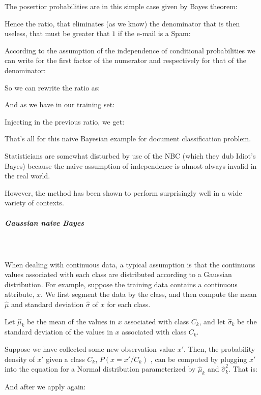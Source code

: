 \begin{tcolorbox}[colframe=black,colback=white,sharp corners]
	The posertior probabilities are in this simple case given by Bayes theorem:
	
	Hence the ratio, that eliminates (as we know) the denominator that is then useless, that must be greater that $1$ if the e-mail is a Spam:
	
	According to the assumption of the independence of conditional probabilities we can write for the first factor of the numerator and respectively for that of the denominator:
	
	So we can rewrite the ratio as:
	
	And as we have in our training set:
	\end{tcolorbox}
	\begin{tcolorbox}[colframe=black,colback=white,sharp corners]
	
	Injecting in the previous ratio, we get:
	
	That's all for this naive Bayesian example for document classification problem.
	\end{tcolorbox}
	Statisticians are somewhat disturbed by use of the NBC (which they dub Idiot's Bayes) because the naive assumption of independence is almost always invalid in the real world.
	
	However, the method has been shown to perform surprisingly well in a wide variety of contexts.
	
	\subparagraph{Gaussian naive Bayes}\mbox{}\\\\
	When dealing with continuous data, a typical assumption is that the continuous values associated with each class are distributed according to a Gaussian distribution. For example, suppose the training data contains a continuous attribute, $x$. We first segment the data by the class, and then compute the mean $\hat{\mu}$ and standard deviation $\hat{\sigma}$ of $x$ for each class.
	
	 Let $\hat{\mu} _{k}$ be the mean of the values in $x$ associated with class $C_k$, and let $\hat{\sigma}_{k}$ be the standard deviation of the values in $x$ associated with class $C_k$.
	 
	 Suppose we have collected some new observation value $x'$. Then, the probability density of $x'$ given a class $C_{k}$, $P(x=x'/C_{k})$ , can be computed by plugging $x'$ into the equation for a Normal distribution parameterized by $\hat{\mu}_{k}$ and $\hat{\sigma}_{k}^{2}$. That is:
	 
	 And after we apply again:
	 
